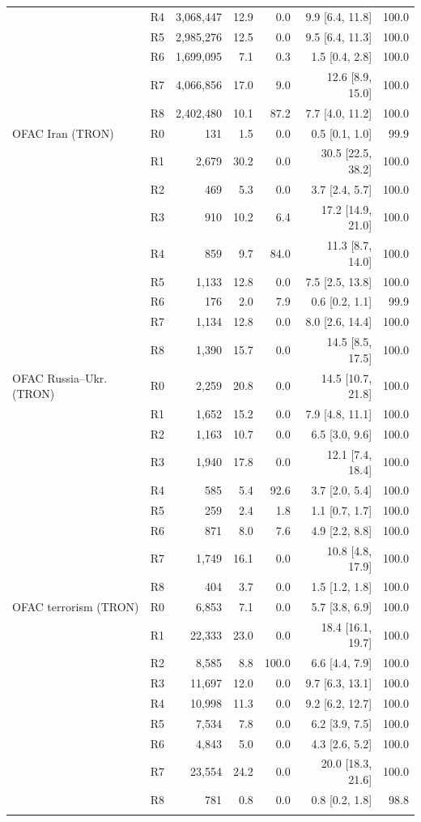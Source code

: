 \begin{tabular}{llrrrrr}
 & R4 & 3,068,447 & 12.9 & 0.0 & 9.9 [6.4, 11.8] & 100.0 \\
 & R5 & 2,985,276 & 12.5 & 0.0 & 9.5 [6.4, 11.3] & 100.0 \\
 & R6 & 1,699,095 & 7.1 & 0.3 & 1.5 [0.4, 2.8] & 100.0 \\
 & R7 & 4,066,856 & 17.0 & 9.0 & 12.6 [8.9, 15.0] & 100.0 \\
 & R8 & 2,402,480 & 10.1 & 87.2 & 7.7 [4.0, 11.2] & 100.0 \\
\addlinespace
OFAC Iran (TRON) & R0 & 131 & 1.5 & 0.0 & 0.5 [0.1, 1.0] & 99.9 \\
 & R1 & 2,679 & 30.2 & 0.0 & 30.5 [22.5, 38.2] & 100.0 \\
 & R2 & 469 & 5.3 & 0.0 & 3.7 [2.4, 5.7] & 100.0 \\
 & R3 & 910 & 10.2 & 6.4 & 17.2 [14.9, 21.0] & 100.0 \\
 & R4 & 859 & 9.7 & 84.0 & 11.3 [8.7, 14.0] & 100.0 \\
 & R5 & 1,133 & 12.8 & 0.0 & 7.5 [2.5, 13.8] & 100.0 \\
 & R6 & 176 & 2.0 & 7.9 & 0.6 [0.2, 1.1] & 99.9 \\
 & R7 & 1,134 & 12.8 & 0.0 & 8.0 [2.6, 14.4] & 100.0 \\
 & R8 & 1,390 & 15.7 & 0.0 & 14.5 [8.5, 17.5] & 100.0 \\
\addlinespace
OFAC Russia--Ukr. (TRON) & R0 & 2,259 & 20.8 & 0.0 & 14.5 [10.7, 21.8] & 100.0 \\
 & R1 & 1,652 & 15.2 & 0.0 & 7.9 [4.8, 11.1] & 100.0 \\
 & R2 & 1,163 & 10.7 & 0.0 & 6.5 [3.0, 9.6] & 100.0 \\
 & R3 & 1,940 & 17.8 & 0.0 & 12.1 [7.4, 18.4] & 100.0 \\
 & R4 & 585 & 5.4 & 92.6 & 3.7 [2.0, 5.4] & 100.0 \\
 & R5 & 259 & 2.4 & 1.8 & 1.1 [0.7, 1.7] & 100.0 \\
 & R6 & 871 & 8.0 & 7.6 & 4.9 [2.2, 8.8] & 100.0 \\
 & R7 & 1,749 & 16.1 & 0.0 & 10.8 [4.8, 17.9] & 100.0 \\
 & R8 & 404 & 3.7 & 0.0 & 1.5 [1.2, 1.8] & 100.0 \\
\addlinespace
OFAC terrorism (TRON) & R0 & 6,853 & 7.1 & 0.0 & 5.7 [3.8, 6.9] & 100.0 \\
 & R1 & 22,333 & 23.0 & 0.0 & 18.4 [16.1, 19.7] & 100.0 \\
 & R2 & 8,585 & 8.8 & 100.0 & 6.6 [4.4, 7.9] & 100.0 \\
 & R3 & 11,697 & 12.0 & 0.0 & 9.7 [6.3, 13.1] & 100.0 \\
 & R4 & 10,998 & 11.3 & 0.0 & 9.2 [6.2, 12.7] & 100.0 \\
 & R5 & 7,534 & 7.8 & 0.0 & 6.2 [3.9, 7.5] & 100.0 \\
 & R6 & 4,843 & 5.0 & 0.0 & 4.3 [2.6, 5.2] & 100.0 \\
 & R7 & 23,554 & 24.2 & 0.0 & 20.0 [18.3, 21.6] & 100.0 \\
 & R8 & 781 & 0.8 & 0.0 & 0.8 [0.2, 1.8] & 98.8 \\
\addlinespace
\bottomrule
\end{tabular}
